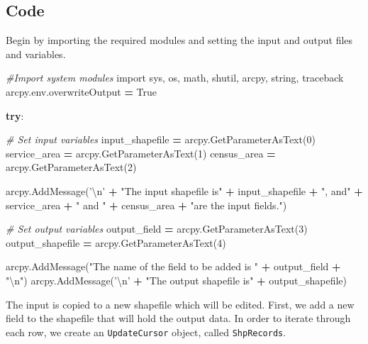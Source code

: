 \documentclass[11pt,]{article}
\newenvironment{Shaded}{\begin{snugshade}}{\end{snugshade}}
\newcommand{\DecValTok}[1]{\textcolor[rgb]{0.00,0.00,0.81}{{#1}}}
\newcommand{\CharTok}[1]{\textcolor[rgb]{0.31,0.60,0.02}{{#1}}}
\newcommand{\StringTok}[1]{\textcolor[rgb]{0.31,0.60,0.02}{{#1}}}
\newcommand{\ImportTok}[1]{{#1}}
\newcommand{\CommentTok}[1]{\textcolor[rgb]{0.56,0.35,0.01}{\textit{{#1}}}}
\newcommand{\VariableTok}[1]{\textcolor[rgb]{0.00,0.00,0.00}{{#1}}}
\newcommand{\ControlFlowTok}[1]{\textcolor[rgb]{0.13,0.29,0.53}{\textbf{{#1}}}}
\newcommand{\OperatorTok}[1]{\textcolor[rgb]{0.81,0.36,0.00}{\textbf{{#1}}}}
\newcommand{\NormalTok}[1]{{#1}}
\begin{document}
\subsection{Code}\label{code-1}

\noindent Begin by importing the required modules and setting the input
and output files and variables.

\begin{Shaded}
\begin{Highlighting}[]
\CommentTok{#Import system modules}
\ImportTok{import} \NormalTok{sys, os, math, shutil, arcpy, string, traceback}
\NormalTok{arcpy.env.overwriteOutput }\OperatorTok{=} \VariableTok{True}

\ControlFlowTok{try}\NormalTok{:}

    \CommentTok{# Set input variables}
    \NormalTok{input_shapefile }\OperatorTok{=} \NormalTok{arcpy.GetParameterAsText(}\DecValTok{0}\NormalTok{)   }
    \NormalTok{service_area }\OperatorTok{=} \NormalTok{arcpy.GetParameterAsText(}\DecValTok{1}\NormalTok{)}
    \NormalTok{census_area }\OperatorTok{=} \NormalTok{arcpy.GetParameterAsText(}\DecValTok{2}\NormalTok{)}

    \NormalTok{arcpy.AddMessage(}\StringTok{'}\CharTok{\textbackslash{}n}\StringTok{'} \OperatorTok{+} \StringTok{"The input shapefile is"} \OperatorTok{+} \NormalTok{input_shapefile }\OperatorTok{+} \StringTok{", and"}
        \OperatorTok{+} \NormalTok{service_area }\OperatorTok{+}  \StringTok{" and "} \OperatorTok{+} \NormalTok{census_area }\OperatorTok{+} \StringTok{"are the input fields."}\NormalTok{)}
    
    \CommentTok{# Set output variables}
    \NormalTok{output_field }\OperatorTok{=} \NormalTok{arcpy.GetParameterAsText(}\DecValTok{3}\NormalTok{)}
    \NormalTok{output_shapefile }\OperatorTok{=} \NormalTok{arcpy.GetParameterAsText(}\DecValTok{4}\NormalTok{)}

    \NormalTok{arcpy.AddMessage(}\StringTok{"The name of the field to be added is "} \OperatorTok{+} \NormalTok{output_field }\OperatorTok{+} \StringTok{"}\CharTok{\textbackslash{}n}\StringTok{"}\NormalTok{)}
    \NormalTok{arcpy.AddMessage(}\StringTok{'}\CharTok{\textbackslash{}n}\StringTok{'} \OperatorTok{+} \StringTok{"The output shapefile is"} \OperatorTok{+} \NormalTok{output_shapefile)}
\end{Highlighting}
\end{Shaded}

\noindent The input is copied to a new shapefile which will be edited.
First, we add a new field to the shapefile that will hold the output
data. In order to iterate through each row, we create an
\texttt{UpdateCursor} object, called \texttt{ShpRecords}.
\end{document}
